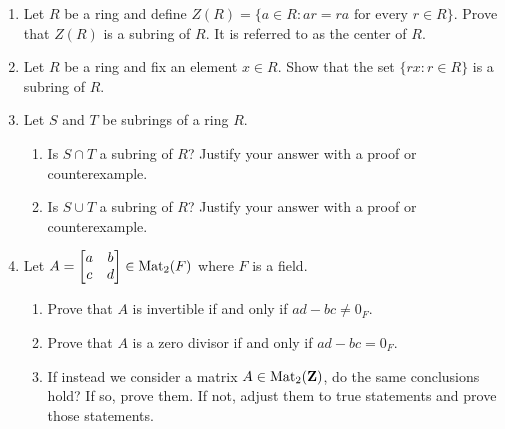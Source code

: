 \documentclass[11pt]{article}
\begin{document}
\begin{enumerate}
\item Let $R$ be a ring and define $\textrm{$Z(R) = \{a \in R: ar = ra$ for every $r \in R$}\}$. Prove that $Z(R)$ is a subring of $R$. It is referred to as the center of $R$. 

\item Let $R$ be a ring and fix an element $x \in R$.  Show that the set $\{rx: r \in R\}$ is a subring of $R$. 

\item Let $S$ and $T$ be subrings of a ring $R$. 
\begin{enumerate}
\item Is $S\cap T$ a subring of $R$?  Justify your answer with a proof or counterexample.
\item Is $S\cup T$ a subring of $R$?  Justify your answer with a proof or counterexample.
\end{enumerate}

\item Let $A = \left[ \begin{matrix} a & b \\ c & d \end{matrix} \right] \in \operatorname{Mat}_2(F)$ where $F$ is a field. 
\begin{enumerate}
\item Prove that $A$ is invertible if and only if $ad-bc \neq 0_{F}$. 
\item Prove that $A$ is a zero divisor if and only if $ad-bc = 0_{F}$. 
\item If instead we consider a matrix $A \in \operatorname{Mat}_2(\mathbf{Z})$, do the same conclusions hold?  If so, prove them.  If not, adjust them to true statements and prove those statements.
\end{enumerate}





\end{enumerate}
\end{document}
